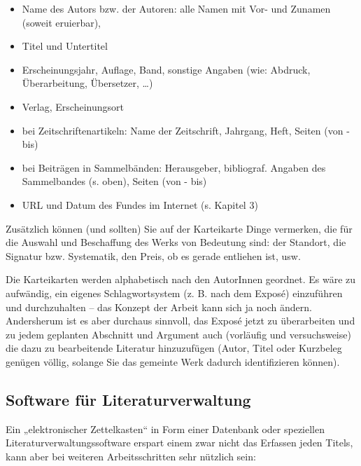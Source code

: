 \documentclass[]{book}
\providecommand{\tightlist}{%
  \setlength{\itemsep}{0pt}\setlength{\parskip}{0pt}}
\theoremstyle{definition}
\theoremstyle{definition}
\theoremstyle{definition}
\theoremstyle{remark}
\begin{document}
\begin{itemize}
\tightlist
\item
  Name des Autors bzw. der Autoren: alle Namen mit Vor- und Zunamen
  (soweit eruierbar),
\item
  Titel und Untertitel
\item
  Erscheinungsjahr, Auflage, Band, sonstige Angaben (wie: Abdruck,
  Überarbeitung, Übersetzer, \ldots{})
\item
  Verlag, Erscheinungsort
\item
  bei Zeitschriftenartikeln: Name der Zeitschrift, Jahrgang, Heft,
  Seiten (von - bis)
\item
  bei Beiträgen in Sammelbänden: Herausgeber, bibliograf. Angaben des
  Sammelbandes (s. oben), Seiten (von - bis)
\item
  URL und Datum des Fundes im Internet (s. Kapitel 3)
\end{itemize}

Zusätzlich können (und sollten) Sie auf der Karteikarte Dinge vermerken,
die für die Auswahl und Beschaffung des Werks von Bedeutung sind: der
Standort, die Signatur bzw. Systematik, den Preis, ob es gerade
entliehen ist, usw.

Die Karteikarten werden alphabetisch nach den AutorInnen geordnet. Es
wäre zu aufwändig, ein eigenes Schlagwortsystem (z. B. nach dem Exposé)
einzuführen und durchzuhalten -- das Konzept der Arbeit kann sich ja
noch ändern. Andersherum ist es aber durchaus sinnvoll, das Exposé jetzt
zu überarbeiten und zu jedem geplanten Abschnitt und Argument auch
(vorläufig und versuchsweise) die dazu zu bearbeitende Literatur
hinzuzufügen (Autor, Titel oder Kurzbeleg genügen völlig, solange Sie
das gemeinte Werk dadurch identifizieren können).

\subsection{Software für
Literaturverwaltung}\label{software-fur-literaturverwaltung}

Ein „elektronischer Zettelkasten`` in Form einer Datenbank oder
speziellen Literaturverwaltungssoftware erspart einem zwar nicht das
Erfassen jeden Titels, kann aber bei weiteren Arbeitsschritten sehr
nützlich sein:
\end{document}
